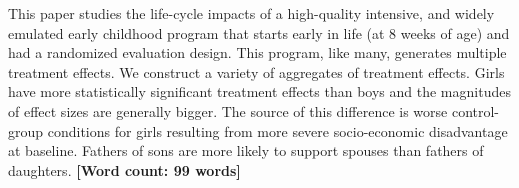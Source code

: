 \noindent This paper studies the life-cycle impacts of a high-quality intensive, and widely emulated early childhood program that starts early in life (at 8 weeks of age) and had a randomized evaluation design. This program, like many, generates multiple treatment effects. We construct a variety of aggregates of treatment effects. Girls have more statistically significant treatment effects than boys and the magnitudes of effect sizes are generally bigger. The source of this difference is worse control-group conditions for girls resulting from more severe socio-economic disadvantage at baseline. Fathers of sons are more likely to support spouses than fathers of daughters. \textbf{[Word count: 99 words]}
